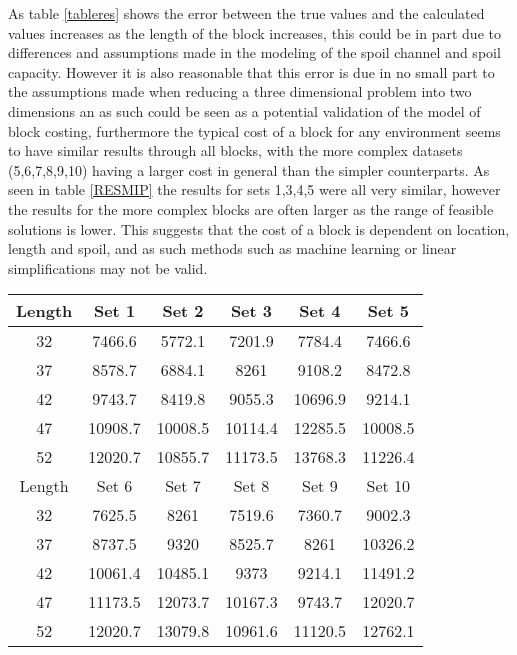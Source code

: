 As table \ref{tableres} shows the error between the true values and the calculated values increases as the length of the block increases, this could be in part due to differences and assumptions made in the modeling of the spoil channel and spoil capacity. However it is also reasonable that this error is due in no small part to the assumptions made when reducing a three dimensional problem into two dimensions an as such could be seen as a potential validation of the model of block costing, furthermore the typical cost of a block for any environment seems to have similar results through all blocks, with the more complex datasets (5,6,7,8,9,10) having a larger cost in general than the simpler counterparts. As seen in table \ref{RESMIP} the results for sets 1,3,4,5 were all very similar, however the results for the more complex blocks are often larger as the range of feasible solutions is lower. This suggests that the cost of a block is dependent on location, length and spoil, and as such methods such as machine learning or linear simplifications may not be valid. 
\begin{center}
\begin{tabular}{ | c | c | c | c | c | c |}
\hline
\label{RESMIP}
	Length & Set 1 & Set 2 & Set 3 & Set 4 & Set 5  \\ \hline
	32 & 7466.6 & 5772.1 & 7201.9 & 7784.4 & 7466.6  \\ \hline
	37 & 8578.7 & 6884.1 & 8261 & 9108.2 & 8472.8  \\ \hline
	42 & 9743.7 & 8419.8 & 9055.3 & 10696.9 & 9214.1 \\ \hline
	47 & 10908.7 & 10008.5 & 10114.4 & 12285.5 & 10008.5 \\ \hline
	52 & 12020.7 & 10855.7 & 11173.5 & 13768.3 & 11226.4 \\ \hline
	\hline
	Length & Set 6 & Set 7 & Set 8 & Set 9 & Set 10  \\ \hline
	32 & 7625.5 & 8261 & 7519.6 & 7360.7 & 9002.3  \\ \hline
	37& 8737.5 & 9320 & 8525.7& 8261 & 10326.2  \\ \hline
	42 & 10061.4 & 10485.1 & 9373 & 9214.1 & 11491.2 \\ \hline
	47 & 11173.5 & 12073.7 & 10167.3 & 9743.7& 12020.7 \\ \hline
	52 & 12020.7 & 13079.8 & 10961.6 & 11120.5 & 12762.1  \\ \hline

\end{tabular}
\end{center}
